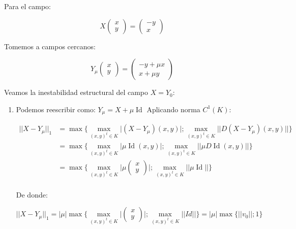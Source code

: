 \begin{exmp}
	
	Para el campo:
	
	\begin{equation*}
		X\begin{pmatrix}
			x\\
			y
		\end{pmatrix}=\begin{pmatrix}
			-y\\
			x
		\end{pmatrix}
	\end{equation*}
	
	Tomemos a campos cercanos:
	
	\begin{equation*}
		Y_\mu\begin{pmatrix}
			x\\
			y
		\end{pmatrix}=\begin{pmatrix}
			-y+\mu x\\
			x + \mu y
		\end{pmatrix}
	\end{equation*}
	
	Veamos la inestabilidad estructural del campo $X = Y_0$:
	
	\begin{enumerate}
		\item Podemos reescribir como: $Y_\mu = X + \mu \operatorname{Id}$
		Aplicando norma $C^1(K)$:
		
		\begin{align*}
			||X-Y_\mu||_1 &=  \max\{\max_{(x,y)^t\in K}\bigg|(X- Y_\mu)(x,y) \bigg| ; \max_{(x,y)^t\in K}||D(X-Y_\mu)(x,y)||\} \\
			&=  \max\{\max_{(x,y)^t\in K}\bigg|\mu \operatorname{Id}(x,y) \bigg| ; \max_{(x,y)^t\in K}||\mu D\operatorname{Id} (x,y)  ||\} \\
			&=  \max\{\max_{(x,y)^t\in K}\bigg|\mu\begin{pmatrix}
				x\\
				y
			\end{pmatrix}\bigg| ; \max_{(x,y)^t\in K}||\mu \operatorname{Id}||\} \\
		\end{align*}
		
		De donde: 
		
		\begin{equation*}
			||X-Y_\mu||_1 = |\mu| \max\{\max_{(x,y)^t\in K}\bigg|\begin{pmatrix}
				x\\
				y
			\end{pmatrix}\bigg| ; \max_{(x,y)^t\in K} ||Id|| \} = |\mu| \max \{||v_0||; 1\}
		\end{equation*}
		

\end{enumerate}
\end{exmp}
